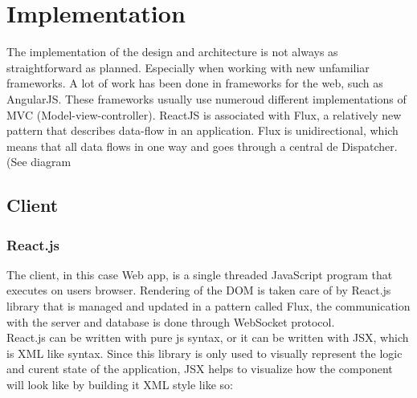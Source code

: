 \chapter{Implementation}
The implementation of the design and architecture is not always as straightforward as planned. Especially when working with new unfamiliar frameworks. A lot of work has been done in frameworks for the web, such as AngularJS. These frameworks usually use numeroud different implementations of MVC (Model-view-controller). ReactJS is associated with Flux, a relatively new pattern that describes data-flow in an application. Flux is unidirectional, which means that all data flows in one way and goes through a central de Dispatcher. (See diagram 
\section{Client}

\subsection{React.js}

The client, in this case Web app, is a single threaded JavaScript program that executes on users browser. Rendering of the DOM is taken care of by React.js library that is managed and updated in a pattern called Flux, the communication with the server and database is done through WebSocket protocol.
\\React.js can be written with pure js syntax, or it can be written with JSX, which is XML like syntax. Since this library is only used to visually represent the logic and curent state of the application, JSX helps to visualize how the component will look like by building it XML style like so:



